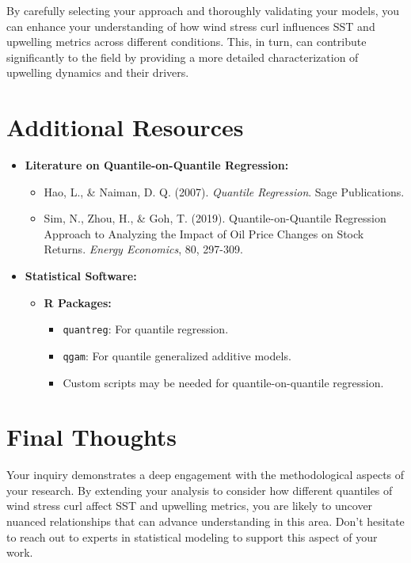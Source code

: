 \documentclass[
  letterpaper,
]{book}
\providecommand{\tightlist}{%
  \setlength{\itemsep}{0pt}\setlength{\parskip}{0pt}}\usepackage{longtable,booktabs,array}
\begin{document}
By carefully selecting your approach and thoroughly validating your
models, you can enhance your understanding of how wind stress curl
influences SST and upwelling metrics across different conditions. This,
in turn, can contribute significantly to the field by providing a more
detailed characterization of upwelling dynamics and their drivers.

\section{Additional Resources}\label{additional-resources}

\begin{itemize}
\tightlist
\item
  \textbf{Literature on Quantile-on-Quantile Regression:}

  \begin{itemize}
  \tightlist
  \item
    Hao, L., \& Naiman, D. Q. (2007). \emph{Quantile Regression}. Sage
    Publications.
  \item
    Sim, N., Zhou, H., \& Goh, T. (2019). Quantile-on-Quantile
    Regression Approach to Analyzing the Impact of Oil Price Changes on
    Stock Returns. \emph{Energy Economics}, 80, 297-309.
  \end{itemize}
\item
  \textbf{Statistical Software:}

  \begin{itemize}
  \tightlist
  \item
    \textbf{R Packages:}

    \begin{itemize}
    \tightlist
    \item
      \texttt{quantreg}: For quantile regression.
    \item
      \texttt{qgam}: For quantile generalized additive models.
    \item
      Custom scripts may be needed for quantile-on-quantile regression.
    \end{itemize}
  \end{itemize}
\end{itemize}

\section{Final Thoughts}\label{final-thoughts}

Your inquiry demonstrates a deep engagement with the methodological
aspects of your research. By extending your analysis to consider how
different quantiles of wind stress curl affect SST and upwelling
metrics, you are likely to uncover nuanced relationships that can
advance understanding in this area. Don't hesitate to reach out to
experts in statistical modeling to support this aspect of your work.
\end{document}
